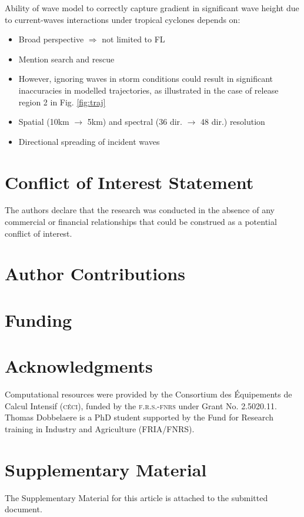 \documentclass[11pt,a4paper]{article}
\begin{document}
Ability of wave model to correctly capture gradient in significant wave height due to current-waves interactions under tropical cyclones depends on:
\begin{itemize}
    \item Broad perspective $\Rightarrow$ not limited to FL
    \item Mention search and rescue
    \item However, ignoring waves in storm conditions could result in significant inaccuracies in modelled trajectories, as illustrated in the case of release region 2 in Fig. \ref{fig:traj}
    \item Spatial (10km $\to$ 5km) and spectral (36 dir. $\to$ 48 dir.) resolution \citep{hegermiller2019wave}
    \item Directional spreading of incident waves \citep{villas2020wave}
\end{itemize}

\section*{Conflict of Interest Statement}
The authors declare that the research was conducted in the absence of any commercial or financial relationships that could be construed as a potential conflict of interest.

\section*{Author Contributions}
  
\section*{Funding}

\section*{Acknowledgments}
Computational resources were provided by the Consortium des \'Equipements de Calcul Intensif (\textsc{c\'eci}), funded by the \textsc{f.r.s.-fnrs} under Grant No. 2.5020.11. Thomas Dobbelaere is a PhD student supported by the Fund for Research training in Industry and Agriculture (\textsc{FRIA}/\textsc{FNRS}).

\section*{Supplementary Material}
The Supplementary Material for this article is attached to the submitted document.

%  




\end{document}
